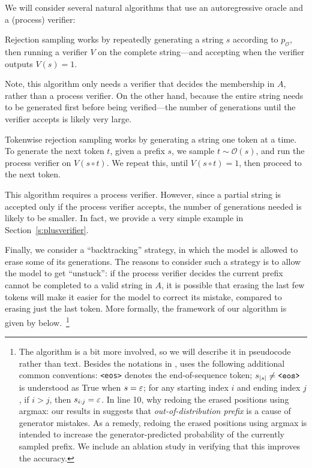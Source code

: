 We will consider several natural algorithms that use an autoregressive oracle and a (process) verifier: 

\begin{definition} 
\label{d:rejection}
Rejection sampling works by repeatedly generating a string $s$ according to $p_{\mathcal{O}}$, then running a verifier $V$ on the complete string---and accepting when the verifier outputs $V(s) = 1$.    
\end{definition}

Note, this algorithm only needs a verifier that decides the membership in $A$, rather than a process verifier. On the other hand, because the entire string needs to be generated first before being verified---the number of generations until the verifier accepts is likely very large.  

\begin{definition} 
\label{d:tokenwise}
Tokenwise rejection sampling works by generating a string one token at a time. To generate the next token $t$, given a prefix $s$, we sample $t \sim \mathcal{O}(s)$, 
and run the process verifier on $V(s \circ t)$. We repeat this, until $V(s \circ t) = 1$, then proceed to the next token.  
\end{definition}

This algorithm requires a process verifier. However, since a partial string is accepted only if the process verifier accepts, the number of generations needed is likely to be smaller. In fact, we provide a very simple example in Section~\ref{s:plusverifier}.  

Finally, we consider a ``backtracking'' strategy, in which the model is allowed to erase some of its generations. The reasons to consider such a strategy is to allow the model to get ``unstuck'': if the process verifier decides the current prefix cannot be completed to a valid string in $A$, it is possible that erasing the last few tokens will make it easier for the model to correct its mistake, compared to erasing just the last token.
More formally, the framework of our algorithm is given by  below.~\footnote{
The algorithm is a bit more involved, so we will describe it in pseudocode rather than text.
Besides the notations in ,
 uses the following additional common conventions: 
\texttt{<eos>} denotes the end-of-sequence token;
$s_{\left| s \right|} \ne \texttt{<eos>}$ is understood as True when $s = \varepsilon$;
for any starting index $i$ and ending index $j$, 
if $i > j$,
then $s_{i:j} = \varepsilon$.
In line 10, why redoing the erased positions using argmax:
our results in  suggests that \emph{out-of-distribution prefix} is a cause of generator mistakes.
As a remedy, redoing the erased positions using argmax is intended to increase the generator-predicted probability of the currently sampled prefix.
We include an ablation study in  verifying that this improves the accuracy.
}

